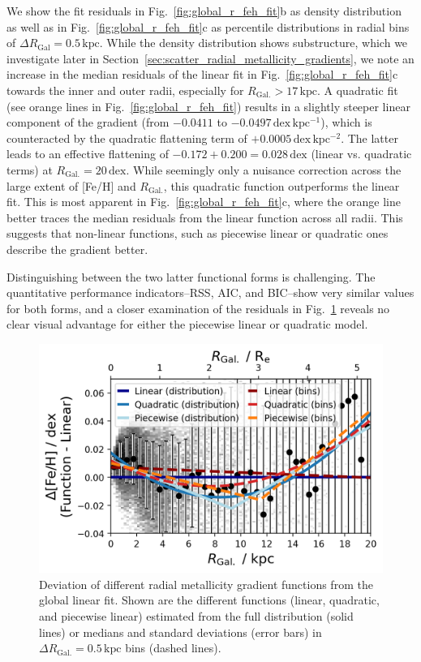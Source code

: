 \documentclass[twocolumn,apj,numberedappendix,appendixfloats]{openjournal}
\begin{document}
\begin{CJK*}{UTF8}{gbsn}
We show the fit residuals in Fig.~\ref{fig:global_r_feh_fit}b as density distribution as well as in Fig.~\ref{fig:global_r_feh_fit}c as percentile distributions in radial bins of $\Delta R_\mathrm{Gal} = 0.5\,\mathrm{kpc}$. While the density distribution shows substructure, which we investigate later in Section~\ref{sec:scatter_radial_metallicity_gradients}, we note an increase in the median residuals of the linear fit in Fig.~\ref{fig:global_r_feh_fit}c towards the inner and outer radii, especially for $R_\mathrm{Gal.} > 17\,\mathrm{kpc}$. A quadratic fit (see orange lines in Fig.~\ref{fig:global_r_feh_fit}) results in a slightly steeper linear component of the gradient (from $-0.0411$ to $-0.0497\,\mathrm{dex\,kpc^{-1}}$), which is counteracted by the quadratic flattening term of $+0.0005\,\mathrm{dex\,kpc^{-2}}$. The latter leads to an effective flattening of $-0.172 + 0.200 = 0.028\,\mathrm{dex}$ (linear vs. quadratic terms) at $R_\mathrm{Gal.} = 20\,\mathrm{dex}$. While seemingly only a nuisance correction across the large extent of [Fe/H] and $R_\mathrm{Gal.}$, this quadratic function outperforms the linear fit. This is most apparent in Fig.~\ref{fig:global_r_feh_fit}c, where the orange line better traces the median residuals from the linear function across all radii. This suggests that non-linear functions, such as piecewise linear or quadratic ones describe the gradient better.

Distinguishing between the two latter functional forms is challenging. The quantitative performance indicators--RSS, AIC, and BIC--show very similar values for both forms, and a closer examination of the residuals in Fig.~\ref{fig:linear_quadratic_piecewise} reveals no clear visual advantage for either the piecewise linear or quadratic model.

\begin{figure}
    \centering
    \includegraphics[width=\columnwidth]{figures/linear_quadratic_piecewise.png}
    \caption{Deviation of different radial metallicity gradient functions from the global linear fit. Shown are the different functions (linear, quadratic, and piecewise linear) estimated from the full distribution (solid lines) or medians and standard deviations (error bars) in $\Delta R_\mathrm{Gal.} = 0.5\,\mathrm{kpc}$ bins (dashed lines).}
    \label{fig:linear_quadratic_piecewise}
\end{figure}


\end{CJK*}
\end{document}

